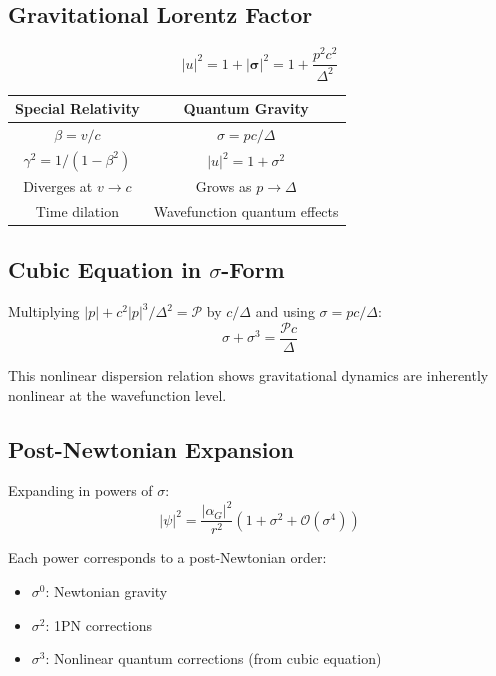 \documentclass[11pt,a4paper]{article}
\theoremstyle{definition}
\theoremstyle{remark}
\begin{document}
	\subsection{Gravitational Lorentz Factor}
	
	\begin{equation}
		\boxed{|u|^2 = 1+|\boldsymbol{\sigma}|^2 = 1+\frac{p^2c^2}{\Delta^2}}
		\label{eq:gravitational_lorentz_factor}
	\end{equation}
	
	\begin{center}
		\begin{tabular}{c|c}
			\textbf{Special Relativity} & \textbf{Quantum Gravity} \\
			\hline
			$\beta = v/c$ & $\sigma = pc/\Delta$ \\
			$\gamma^2 = 1/(1-\beta^2)$ & $|u|^2 = 1+\sigma^2$ \\
			Diverges at $v\to c$ & Grows as $p\to\Delta$ \\
			Time dilation & Wavefunction quantum effects \\
		\end{tabular}
	\end{center}
	
	\subsection{Cubic Equation in $\sigma$-Form}
	
	Multiplying $|p|+c^2|p|^3/\Delta^2=\mathcal{P}$ by $c/\Delta$ and using $\sigma=pc/\Delta$:
	\begin{equation}
		\boxed{\sigma + \sigma^3 = \frac{\mathcal{P}c}{\Delta}}
		\label{eq:cubic_sigma}
	\end{equation}
	
	This nonlinear dispersion relation shows gravitational dynamics are inherently nonlinear at the wavefunction level.
	
	\subsection{Post-Newtonian Expansion}
	
	Expanding in powers of $\sigma$:
	\begin{equation}
		|\psi|^2 = \frac{|\alpha_G|^2}{r^2}(1+\sigma^2+\mathcal{O}(\sigma^4))
	\end{equation}
	
	Each power corresponds to a post-Newtonian order:
	\begin{itemize}
		\item $\sigma^0$: Newtonian gravity
		\item $\sigma^2$: 1PN corrections
		\item $\sigma^3$: Nonlinear quantum corrections (from cubic equation)
	\end{itemize}
	
\end{document}
